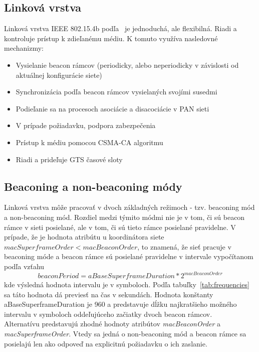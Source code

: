 \subsection{Linková vrstva}
\indent\indent Linková vrstva IEEE 802.15.4b podľa~\cite{ieee06} je jednoduchá, ale flexibilná. Riadi a kontroluje prístup k zdieľanému médiu. K tomuto využíva nasledovné mechanizmy:
\begin{itemize}
\item Vysielanie beacon rámcov (periodicky, alebo neperiodicky v závislosti od aktuálnej konfigurácie siete)
\item Synchronizácia podľa beacon rámcov vysielaných svojími susedmi
\item Podieľanie sa na procesoch asociácie a disacociácie v PAN sieti
\item V prípade požiadavku, podpora zabezpečenia
\item Prístup k médiu pomocou CSMA-CA algoritmu
\item Riadi a prideľuje GTS časové sloty 
\end{itemize}

\subsection{Beaconing a non-beaconing módy}
\indent\indent  Linková vrstva môže pracovať v dvoch základných režimoch - tzv. beaconing mód a non-beaconing mód. Rozdiel medzi týmito módmi nie je v tom, či sú beacon rámce v sieti posielané, ale v tom, či sú tieto rámce posielané pravidelne. V prípade, že je hodnota atribútu u koordinátora siete $macSuperframeOrder < macBeaconOrder$, to znamená, že sieť pracuje v beaconing móde a beacon rámce sú posielané pravidelne v intervale vypočítanom podľa vzťahu 
$$ beaconPeriod = aBaseSuperframeDuration * 2^{macBeaconOrder}$$
kde výsledná hodnota intervalu je v symboloch. Podľa tabuľky~\ref{tab:frequencies} sa táto hodnota dá previesť na čas v sekundách. Hodnota konštanty aBaseSuperframeDuration je 960 a predstavuje dĺžku najkratšieho možného intervalu v symboloch oddeľujúceho začiatky dvoch beacon rámcov.\\
\indent Alternatívu predstavujú zhodné hodnoty atribútov \textit{macBeaconOrder} a \textit{macSuperframeOrder}. Vtedy sa jedná o non-beaconing mód a beacon rámce sa posielajú len ako odpoveď na explicitnú požiadavku o ich zaslanie.\\

